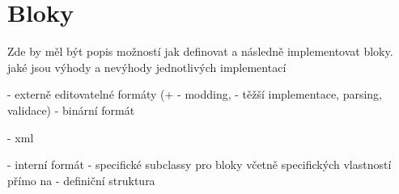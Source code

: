
\section{Bloky}

Zde by měl být popis možností jak definovat a následně implementovat bloky. jaké jsou výhody a nevýhody jednotlivých implementací

- externě editovatelné formáty (+ - modding, - těžší implementace, parsing, validace)
- binární formát

- xml


- interní formát
- specifické subclassy pro bloky včetně specifických vlastností přímo na 
- definiční struktura





